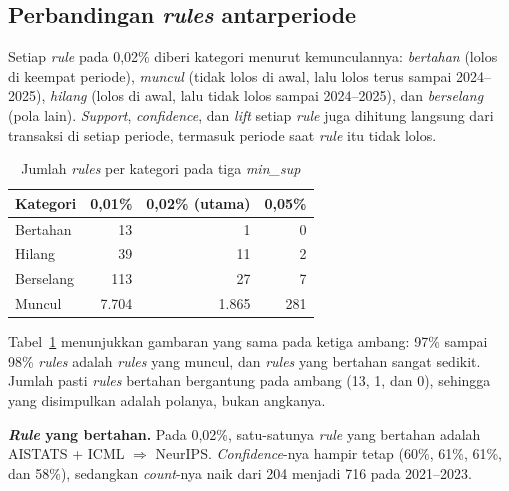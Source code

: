 \subsection{Perbandingan \textit{rules} antarperiode}
\label{sec:hasil-e-banding}
Setiap \textit{rule} pada 0,02\% diberi kategori menurut kemunculannya: \textit{bertahan} (lolos di keempat periode), \textit{muncul} (tidak lolos di awal, lalu lolos terus sampai 2024--2025), \textit{hilang} (lolos di awal, lalu tidak lolos sampai 2024--2025), dan \textit{berselang} (pola lain). \textit{Support}, \textit{confidence}, dan \textit{lift} setiap \textit{rule} juga dihitung langsung dari transaksi di setiap periode, termasuk periode saat \textit{rule} itu tidak lolos.

\begin{table}[ht]
\caption{Jumlah \textit{rules} per kategori pada tiga \textit{min\_sup}}
\label{tab:e-kategori}
\small
\begin{tabular}{@{}lrrr@{}}
\toprule
\textbf{Kategori} & \textbf{0,01\%} & \textbf{0,02\% (utama)} & \textbf{0,05\%} \\
\midrule
Bertahan & 13 & 1 & 0 \\
Hilang & 39 & 11 & 2 \\
Berselang & 113 & 27 & 7 \\
Muncul & 7.704 & 1.865 & 281 \\
\bottomrule
\end{tabular}
\end{table}

Tabel~\ref{tab:e-kategori} menunjukkan gambaran yang sama pada ketiga ambang: 97\% sampai 98\% \textit{rules} adalah \textit{rules} yang muncul, dan \textit{rules} yang bertahan sangat sedikit. Jumlah pasti \textit{rules} bertahan bergantung pada ambang (13, 1, dan 0), sehingga yang disimpulkan adalah polanya, bukan angkanya.

\textbf{\textit{Rule} yang bertahan.} Pada 0,02\%, satu-satunya \textit{rule} yang bertahan adalah AISTATS + ICML $\Rightarrow$ NeurIPS. \textit{Confidence}-nya hampir tetap (60\%, 61\%, 61\%, dan 58\%), sedangkan \textit{count}-nya naik dari 204 menjadi 716 pada 2021--2023.

